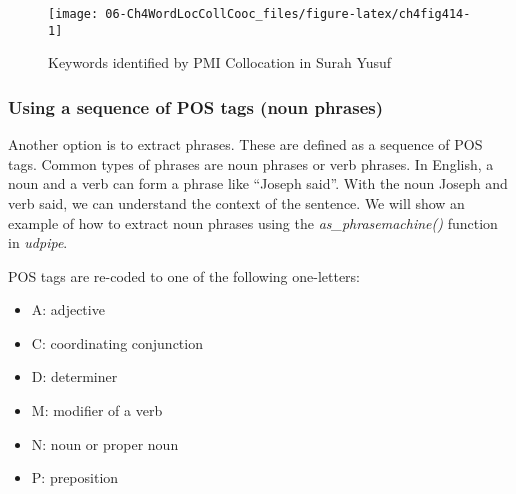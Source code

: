 \documentclass[
]{article}
\newenvironment{Shaded}{\begin{snugshade}}{\end{snugshade}}
\newcommand{\AttributeTok}[1]{\textcolor[rgb]{0.13,0.29,0.53}{#1}}
\newcommand{\FunctionTok}[1]{\textcolor[rgb]{0.13,0.29,0.53}{\textbf{#1}}}
\newcommand{\NormalTok}[1]{#1}
\newcommand{\OtherTok}[1]{\textcolor[rgb]{0.56,0.35,0.01}{#1}}
\newcommand{\SpecialCharTok}[1]{\textcolor[rgb]{0.81,0.36,0.00}{\textbf{#1}}}
\newcommand{\StringTok}[1]{\textcolor[rgb]{0.31,0.60,0.02}{#1}}
\providecommand{\tightlist}{%
  \setlength{\itemsep}{0pt}\setlength{\parskip}{0pt}}
\begin{document}
\begin{Shaded}
\end{Shaded}

\normalsize

\begin{figure}

{\centering \texttt{[image: 06-Ch4WordLocCollCooc\_files/figure-latex/ch4fig414-1]} 

}

\caption{Keywords identified by PMI Collocation in Surah Yusuf}\label{fig:ch4fig414}
\end{figure}

\hypertarget{using-a-sequence-of-pos-tags-noun-phrases}{%
\subsubsection{Using a sequence of POS tags (noun phrases)}\label{using-a-sequence-of-pos-tags-noun-phrases}}

Another option is to extract phrases. These are defined as a sequence of POS tags. Common types of phrases are noun phrases or verb phrases. In English, a noun and a verb can form a phrase like ``Joseph said''. With the noun Joseph and verb said, we can understand the context of the sentence. We will show an example of how to extract noun phrases using the \emph{as\_phrasemachine()} function in \emph{udpipe}.

POS tags are re-coded to one of the following one-letters:

\begin{itemize}
\tightlist
\item
  A: adjective
\item
  C: coordinating conjunction
\item
  D: determiner
\item
  M: modifier of a verb
\item
  N: noun or proper noun
\item
  P: preposition
\end{itemize}
\end{document}
